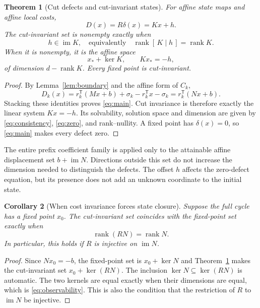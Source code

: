 \documentclass[11pt,a4paper]{article}
\newtheorem{theorem}{Theorem}\newtheorem{proposition}[theorem]{Proposition}\newtheorem{lemma}[theorem]{Lemma}\newtheorem{corollary}[theorem]{Corollary}
\theoremstyle{definition}\newtheorem{definition}[theorem]{Definition}\newtheorem{example}[theorem]{Example}\newtheorem{remark}[theorem]{Remark}
\DeclareMathOperator{\rank}{rank}\DeclareMathOperator{\im}{im}\DeclareMathOperator{\spanop}{span}\DeclareMathOperator{\diag}{diag}
\begin{document}
\begin{theorem}[Cut defects and cut-invariant states]\label{thm:cut}
For affine state maps and affine local costs,
\begin{equation}\label{eq:main}
 \boxed{D(x)=R\delta(x)=Kx+h.}
\end{equation}
The cut-invariant set is nonempty exactly when
\begin{equation}\label{eq:consistency}
 h\in\im K,
 \quad\text{equivalently}\quad
 \rank[\,K\mid h\,]=\rank K.
\end{equation}
When it is nonempty, it is the affine space
\begin{equation}\label{eq:zero}
 x_*+\ker K,\qquad Kx_*=-h,
\end{equation}
of dimension $d-\rank K$. Every fixed point is cut-invariant.
\end{theorem}
\begin{proof}
By Lemma~\ref{lem:boundary} and the affine form of $C_k$,
\[
 D_k(x)=r_k^{\mathsf T}(Mx+b)+\sigma_k
              -r_k^{\mathsf T}x-\sigma_k
       =r_k^{\mathsf T}(Nx+b).
\]
Stacking these identities proves \eqref{eq:main}. Cut invariance is
therefore exactly the linear system $Kx=-h$. Its solvability,
solution space and dimension are given by \eqref{eq:consistency},
\eqref{eq:zero}, and rank--nullity. A fixed point has
$\delta(x)=0$, so \eqref{eq:main} makes every defect zero.
\end{proof}

The entire prefix coefficient family is applied only to the attainable
affine displacement set $b+\im N$. Directions outside this set do not
increase the dimension needed to distinguish the defects.
The offset $h$ affects the zero-defect equation, but its presence does
not add an unknown coordinate to the initial state.

\begin{corollary}[When cost invariance forces state closure]\label{cor:closure}
Suppose the full cycle has a fixed point $x_0$. The cut-invariant set
coincides with the fixed-point set exactly when
\begin{equation}\label{eq:observability}
 \rank(RN)=\rank N.
\end{equation}
In particular, this holds if $R$ is injective on $\im N$.
\end{corollary}
\begin{proof}
Since $Nx_0=-b$, the fixed-point set is $x_0+\ker N$ and
Theorem~\ref{thm:cut} makes the cut-invariant set $x_0+\ker(RN)$.
The inclusion $\ker N\subseteq\ker(RN)$ is automatic. The two kernels
are equal exactly when their dimensions are equal, which is
\eqref{eq:observability}. This is also the condition that the
restriction of $R$ to $\im N$ be injective.
\end{proof}
\end{document}
